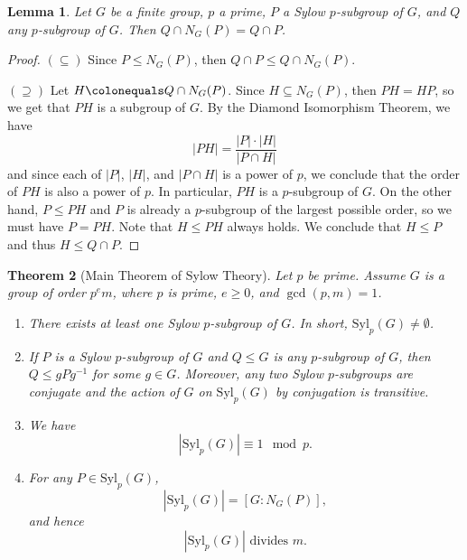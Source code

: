 \documentclass[12pt]{report}
\newtheorem{theorem}{Theorem}[chapter]
\newtheorem{lemma}[theorem]{Lemma}
\numberwithin{equation}{section}
\numberwithin{theorem}{chapter}
\theoremstyle{definition}
\newtheorem*{basic properties}{Basic Properties}
\newtheorem*{Important Remark}{Important Remark}
\begin{document}
\begin{lemma}\label{lemma Sylow normalizer}
Let $G$ be a finite group, $p$ a prime, $P$ a Sylow $p$-subgroup of $G$, and $Q$ any $p$-subgroup of $G$. Then $Q \cap N_G(P) = Q \cap P$.	
\end{lemma}


\begin{proof}
$(\subseteq)$ Since $P \leq N_G(P)$, then $Q \cap P \leq Q \cap N_G(P)$. 

$(\supseteq)$ Let $H \colonequals  Q \cap N_G(P)$. Since $H \subseteq N_G(P)$, then $PH=HP$, so  we get that $PH$ is a subgroup of $G$. 
By the Diamond Isomorphism Theorem, we have
$$|PH| = \frac{|P| \cdot |H|}{|P \cap H|}$$
and since each of $|P|$, $|H|$, and $|P \cap H|$ is a power of $p$, we conclude that the order of $PH$ is also a power of $p$. In particular, $PH$ is a $p$-subgroup of $G$. On the other hand, $P \leq PH$ and $P$ is already a $p$-subgroup of the largest possible order, so we must have $P = PH$. Note that $H \leq PH$ always holds. We conclude that $H \leq P$ and thus $H \leq Q \cap P$.
\end{proof}






\begin{theorem}[Main Theorem of Sylow Theory]\label{Sylow}
Let $p$ be prime.
Assume $G$ is a group of order $p^e m$, where $p$ is prime, $e \geqslant 0$, and $\gcd(p,m) = 1$. 

\begin{enumerate}[itemsep=-0.1em,leftmargin=21pt]
\item There exists at least one Sylow $p$-subgroup of $G$. In short, $\mathrm{Syl}_p(G) \neq \emptyset$.

\item If $P$ is a Sylow $p$-subgroup of $G$ and $Q \leq G$ is any $p$-subgroup of $G$, then $Q \leq gPg^{-1}$ for some $g \in G$. Moreover, any two Sylow $p$-subgroups are conjugate and the action of $G$ on $\mathrm{Syl}_p(G)$ by conjugation is transitive.

\item We have
$$| \mathrm{Syl}_p(G)| \equiv 1 \mod{p}.$$
\item For any $P \in \mathrm{Syl}_p(G)$, 
$$|\mathrm{Syl}_p(G)| = [G: N_G(P)],$$
and hence
$$| \mathrm{Syl}_p(G)| \text{ divides } m.$$
\end{enumerate}
\end{theorem}
\end{document}
